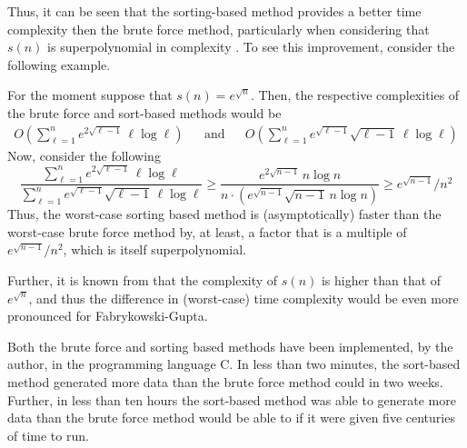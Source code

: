 Thus, it can be seen that the sorting-based method provides a better time complexity then the brute force method, particularly when considering that $s(n)$ is superpolynomial in complexity \cite{OnGrowth}.
To see this improvement, consider the following example.

\begin{example}
	For the moment suppose that $s(n) = e^{\sqrt{n}}$.
	Then, the respective complexities of the brute force and sort-based methods would be
	\begin{align*}
	O\left(
	\sum_{\ell=1}^n e^{2 \sqrt{\ell-1}} \, \ell \log \ell
	\right)
	&&\text{and}&&
	O\left(
	\sum_{\ell = 1}^n e^{\sqrt{\ell-1}} \sqrt{\ell-1} \, \ell \log \ell
	\right)
	\end{align*}
	Now, consider the following
	\[
	  \frac
	  {\displaystyle \sum_{\ell=1}^n e^{2 \sqrt{\ell-1}} \, \ell \log \ell}
	  {\displaystyle  \sum_{\ell = 1}^n e^{\sqrt{\ell-1}} \sqrt{\ell-1} \, \ell \log \ell}
	  \geq
	  \frac
	  {\displaystyle e^{2 \sqrt{n-1}} \, n \log n}
	  {\displaystyle n \cdot \left( e^{\sqrt{n-1}} \sqrt{n-1} \, n \log n \right) }
	  \geq
	  e^{\sqrt{n-1}} / n^2
	\]
	Thus, the worst-case sorting based method is (asymptotically) faster than the worst-case brute force method by, at least, a factor that is a multiple of $e^{\sqrt{n-1}}/n^2$, which is itself superpolynomial.
	
	Further, it is known from \cite{OnGrowth} that the complexity of $s(n)$ is higher than that of $e^{\sqrt{n}}$, and thus the difference in (worst-case) time complexity would be even more pronounced for Fabrykowski-Gupta.
\end{example}

\begin{remark}
	Both the brute force and sorting based methods have been implemented, by the author, in the programming language C.
	In less than two minutes, the sort-based method generated more data than the brute force method could in two weeks.
	Further, in less than ten hours the sort-based method was able to generate more data than the brute force method would be able to if it were given five centuries of time to run.
\end{remark}

